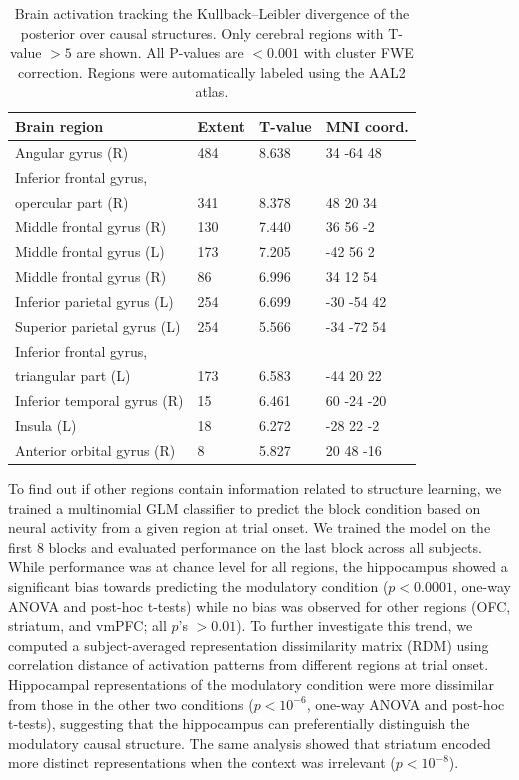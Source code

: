 \documentclass[10pt,letterpaper]{article}
\begin{document}
\begin{table}[!ht]
\begin{center} 
\caption{Brain activation tracking the Kullback--Leibler divergence of the posterior over causal structures. Only cerebral regions with T-value $ > 5$ are shown. All P-values are $< 0.001$ with cluster FWE correction. Regions were automatically labeled using the AAL2 atlas.} 
\label{kl-divergence-table} 
\vskip 0.12in
\begin{tabular}{llll} 
\hline
Brain region    &  Extent & T-value  & MNI coord. \\
\hline
Angular gyrus (R) &	484	& 8.638 &	34	-64	48\\
Inferior frontal gyrus,\\opercular part (R) &	341 &	8.378& 48	 20	34 \\
Middle frontal gyrus (R) &	130	& 7.440 &	36	56	-2 \\
Middle frontal gyrus (L) &	173	& 7.205 &	-42	56	2 \\
Middle frontal gyrus (R) &	86	& 6.996 &	34	12	54 \\
Inferior parietal gyrus (L) &	254 	& 6.699 &	-30	-54	42 \\
Superior parietal gyrus (L)	 & 254	& 5.566 &	-34	-72	54 \\
Inferior frontal gyrus,\\triangular part (L) &	173	& 6.583 & -44	20	22 \\
Inferior temporal gyrus (R) &	 15	& 6.461 &	60	-24	-20 \\
Insula (L)	& 18	 & 6.272	& -28	22	-2 \\
Anterior orbital gyrus (R)& 	8  &	5.827 &	20	48	-16 \\
\hline
\end{tabular} 
\end{center} 
\end{table}

To find out if other regions contain information related to structure learning, we trained a multinomial GLM classifier to predict the block condition based on neural activity from a given region at trial onset. We trained the model on the first 8 blocks and evaluated performance on the last block across all subjects. While performance was at chance level for all regions, the hippocampus showed a significant bias towards predicting the modulatory condition ($p < 0.0001$, one-way ANOVA and post-hoc t-tests) while no bias was observed for other regions (OFC, striatum, and vmPFC; all $p$'s $> 0.01$). To further investigate this trend, we computed a subject-averaged representation dissimilarity matrix (RDM) using correlation distance of activation patterns from different regions at trial onset. Hippocampal representations of the modulatory condition were more dissimilar from those in the other two conditions ($p < 10^{-6}$, one-way ANOVA and post-hoc t-tests), suggesting that the hippocampus can preferentially distinguish the modulatory causal structure. The same analysis showed that striatum encoded more distinct representations when the context was irrelevant ($p < 10^{-8}$).
\end{document}
